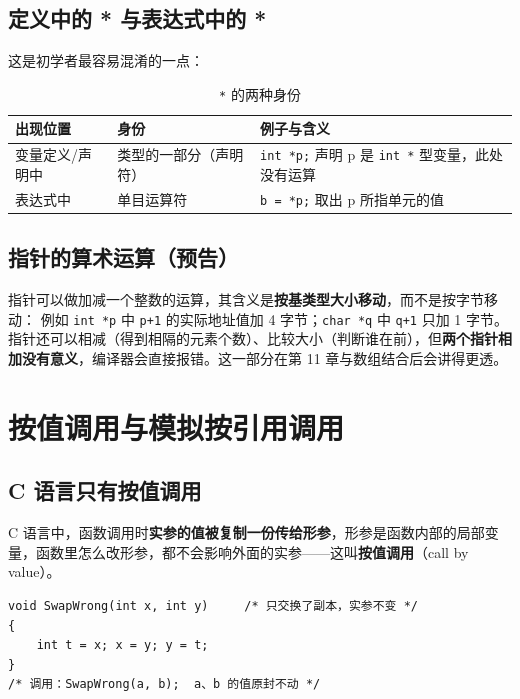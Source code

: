 \subsection{定义中的 * 与表达式中的 *}
这是初学者最容易混淆的一点：
\begin{table}[htbp]
\centering
\caption{\texttt{*} 的两种身份}
\footnotesize
\begin{tabularx}{\textwidth}{@{}p{3.4cm}p{3.6cm}X@{}}
\toprule
出现位置 & 身份 & 例子与含义 \\
\midrule
变量定义/声明中 & 类型的一部分（声明符） & \texttt{int *p;} 声明 p 是 \texttt{int *} 型变量，此处没有运算 \\
表达式中 & 单目运算符 & \texttt{b = *p;} 取出 p 所指单元的值 \\
\bottomrule
\end{tabularx}
\end{table}


\subsection{指针的算术运算（预告）}
指针可以做加减一个整数的运算，其含义是\textbf{按基类型大小移动}，而不是按字节移动：
例如 \texttt{int *p} 中 \texttt{p+1} 的实际地址值加 4 字节；\texttt{char *q} 中 \texttt{q+1} 只加 1 字节。指针还可以相减（得到相隔的元素个数）、比较大小（判断谁在前），但\textbf{两个指针相加没有意义}，编译器会直接报错。这一部分在第 11 章与数组结合后会讲得更透。

\section{按值调用与模拟按引用调用}
\subsection{C 语言只有按值调用}
C 语言中，函数调用时\textbf{实参的值被复制一份传给形参}，形参是函数内部的局部变量，函数里怎么改形参，都不会影响外面的实参——这叫\textbf{按值调用}（call by value）。
\begin{lstlisting}
void SwapWrong(int x, int y)     /* 只交换了副本，实参不变 */
{
    int t = x; x = y; y = t;
}
/* 调用：SwapWrong(a, b);  a、b 的值原封不动 */
\end{lstlisting}

